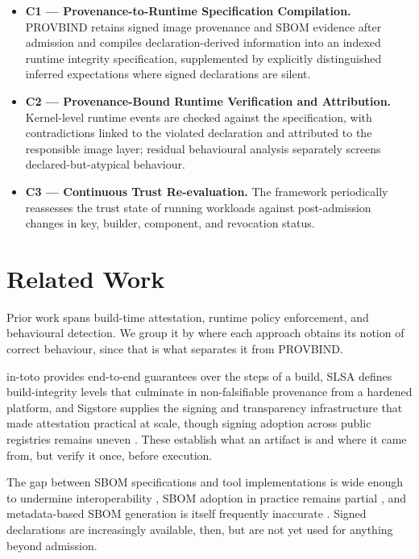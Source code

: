 \documentclass[conference]{IEEEtran}
\begin{document}
\begin{itemize}
\item \textbf{C1 --- Provenance-to-Runtime Specification Compilation.}
PROVBIND retains signed image provenance and SBOM evidence after
admission and compiles declaration-derived information into an indexed
runtime integrity specification, supplemented by explicitly
distinguished inferred expectations where signed declarations are
silent.

\item \textbf{C2 --- Provenance-Bound Runtime Verification and
Attribution.} Kernel-level runtime events are checked against the
specification, with contradictions linked to the violated declaration
and attributed to the responsible image layer; residual behavioural
analysis separately screens declared-but-atypical behaviour.

\item \textbf{C3 --- Continuous Trust Re-evaluation.} The framework
periodically reassesses the trust state of running workloads against
post-admission changes in key, builder, component, and revocation
status.
\end{itemize}

\section{Related Work}

Prior work spans build-time attestation, runtime policy enforcement, and
behavioural detection. We group it by where each approach obtains its
notion of correct behaviour, since that is what separates it from
PROVBIND.

in-toto \cite{intoto2019} provides end-to-end guarantees over the steps
of a build, SLSA \cite{slsa2023} defines build-integrity levels that
culminate in non-falsifiable provenance from a hardened platform, and
Sigstore \cite{sigstore2022} supplies the signing and transparency
infrastructure that made attestation practical at scale, though signing
adoption across public registries remains uneven \cite{schorlemmer2024}.
These establish what an artifact is and where it came from, but verify it
once, before execution.

The gap between SBOM specifications and tool implementations is wide
enough to undermine interoperability \cite{xia2023}, SBOM adoption in
practice remains partial \cite{zahan2023}, and metadata-based SBOM
generation is itself frequently inaccurate \cite{yu2024}. Signed
declarations are increasingly available, then, but are not yet used for
anything beyond admission.
\end{document}
